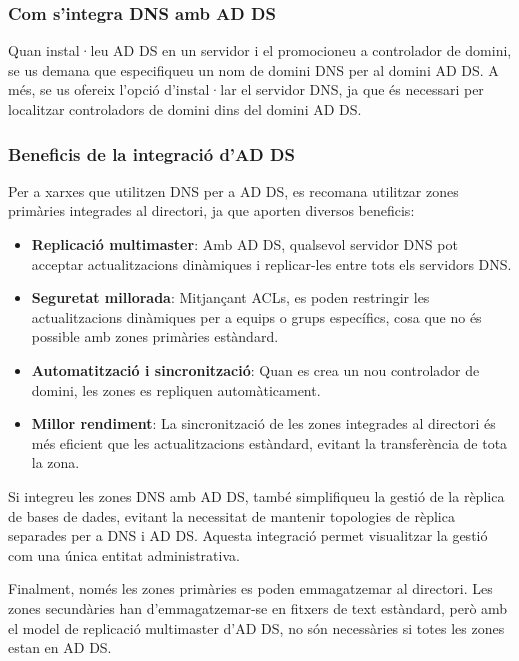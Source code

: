 \documentclass[
  a4paper,
]{article}
\providecommand{\tightlist}{%
  \setlength{\itemsep}{0pt}\setlength{\parskip}{0pt}}
\begin{document}
\subsubsection{Com s'integra DNS amb AD
DS}\label{com-sintegra-dns-amb-ad-ds}

Quan instal·leu AD DS en un servidor i el promocioneu a controlador de
domini, se us demana que especifiqueu un nom de domini DNS per al domini
AD DS. A més, se us ofereix l'opció d'instal·lar el servidor DNS, ja que
és necessari per localitzar controladors de domini dins del domini AD
DS.

\subsubsection{Beneficis de la integració d'AD
DS}\label{beneficis-de-la-integraciuxf3-dad-ds}

Per a xarxes que utilitzen DNS per a AD DS, es recomana utilitzar zones
primàries integrades al directori, ja que aporten diversos beneficis:

\begin{itemize}
\tightlist
\item
  \textbf{Replicació multimaster}: Amb AD DS, qualsevol servidor DNS pot
  acceptar actualitzacions dinàmiques i replicar-les entre tots els
  servidors DNS.
\item
  \textbf{Seguretat millorada}: Mitjançant ACLs, es poden restringir les
  actualitzacions dinàmiques per a equips o grups específics, cosa que
  no és possible amb zones primàries estàndard.
\item
  \textbf{Automatització i sincronització}: Quan es crea un nou
  controlador de domini, les zones es repliquen automàticament.
\item
  \textbf{Millor rendiment}: La sincronització de les zones integrades
  al directori és més eficient que les actualitzacions estàndard,
  evitant la transferència de tota la zona.
\end{itemize}

Si integreu les zones DNS amb AD DS, també simplifiqueu la gestió de la
rèplica de bases de dades, evitant la necessitat de mantenir topologies
de rèplica separades per a DNS i AD DS. Aquesta integració permet
visualitzar la gestió com una única entitat administrativa.

Finalment, només les zones primàries es poden emmagatzemar al directori.
Les zones secundàries han d'emmagatzemar-se en fitxers de text
estàndard, però amb el model de replicació multimaster d'AD DS, no són
necessàries si totes les zones estan en AD DS.
\end{document}
